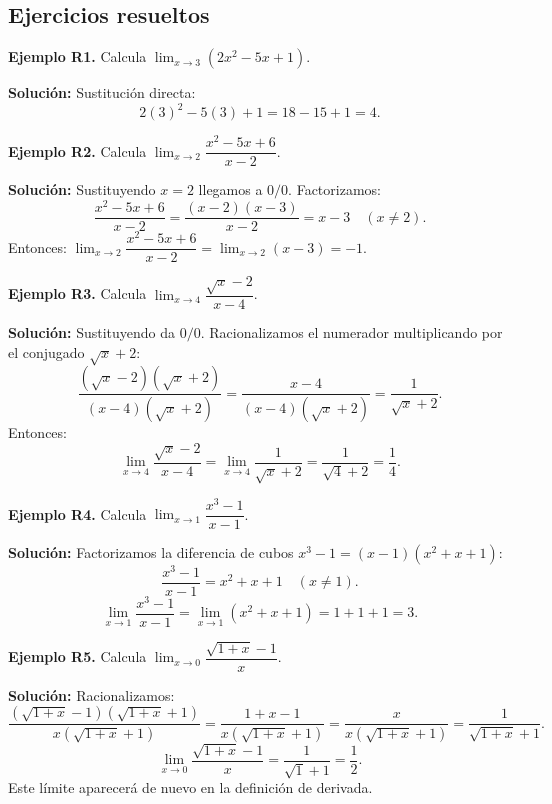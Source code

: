 \documentclass[12pt, letterpaper]{article}
\begin{document}
\subsection{Ejercicios resueltos}

\textbf{Ejemplo R1.} Calcula $\lim_{x \to 3} (2x^2 - 5x + 1)$.

\begin{cuadrosolucion}
  \textbf{Solución:} Sustitución directa:
  $$2(3)^2 - 5(3) + 1 = 18 - 15 + 1 = 4.$$
\end{cuadrosolucion}

\textbf{Ejemplo R2.} Calcula $\lim_{x \to 2} \dfrac{x^2 - 5x + 6}{x - 2}$.

\begin{cuadrosolucion}
  \textbf{Solución:} Sustituyendo $x = 2$ llegamos a $0/0$. Factorizamos:
  $$\frac{x^2 - 5x + 6}{x - 2} = \frac{(x - 2)(x - 3)}{x - 2} = x - 3 \quad (x \neq 2).$$
  Entonces: $\lim_{x \to 2} \dfrac{x^2 - 5x + 6}{x - 2} = \lim_{x \to 2} (x - 3) = -1$.
\end{cuadrosolucion}

\textbf{Ejemplo R3.} Calcula $\lim_{x \to 4} \dfrac{\sqrt{x} - 2}{x - 4}$.

\begin{cuadrosolucion}
  \textbf{Solución:} Sustituyendo da $0/0$. Racionalizamos el numerador multiplicando por el conjugado $\sqrt{x} + 2$:
  $$\frac{(\sqrt{x} - 2)(\sqrt{x} + 2)}{(x - 4)(\sqrt{x} + 2)} = \frac{x - 4}{(x - 4)(\sqrt{x} + 2)} = \frac{1}{\sqrt{x} + 2}.$$
  Entonces:
  $$\lim_{x \to 4} \dfrac{\sqrt{x} - 2}{x - 4} = \lim_{x \to 4} \dfrac{1}{\sqrt{x} + 2} = \dfrac{1}{\sqrt{4} + 2} = \dfrac{1}{4}.$$
\end{cuadrosolucion}

\textbf{Ejemplo R4.} Calcula $\lim_{x \to 1} \dfrac{x^3 - 1}{x - 1}$.

\begin{cuadrosolucion}
  \textbf{Solución:} Factorizamos la diferencia de cubos $x^3 - 1 = (x - 1)(x^2 + x + 1)$:
  $$\frac{x^3 - 1}{x - 1} = x^2 + x + 1 \quad (x \neq 1).$$
  $$\lim_{x \to 1} \dfrac{x^3 - 1}{x - 1} = \lim_{x \to 1} (x^2 + x + 1) = 1 + 1 + 1 = 3.$$
\end{cuadrosolucion}

\textbf{Ejemplo R5.} Calcula $\lim_{x \to 0} \dfrac{\sqrt{1 + x} - 1}{x}$.

\begin{cuadrosolucion}
  \textbf{Solución:} Racionalizamos:
  $$\frac{(\sqrt{1 + x} - 1)(\sqrt{1 + x} + 1)}{x(\sqrt{1 + x} + 1)} = \frac{1 + x - 1}{x(\sqrt{1 + x} + 1)} = \frac{x}{x(\sqrt{1 + x} + 1)} = \frac{1}{\sqrt{1 + x} + 1}.$$
  $$\lim_{x \to 0} \dfrac{\sqrt{1 + x} - 1}{x} = \dfrac{1}{\sqrt{1} + 1} = \dfrac{1}{2}.$$
  Este límite aparecerá de nuevo en la definición de derivada.
\end{cuadrosolucion}
\end{document}
